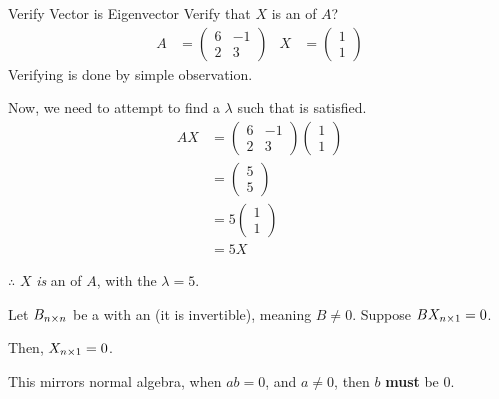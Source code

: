 \begin{example}{Verify Vector is Eigenvector}
  Verify that $X$ is an  of $A$?
  \begin{align*}
    A &=
        \begin{pmatrix}
          6 & -1 \\
          2 & 3
        \end{pmatrix} &
                        X &=
                            \begin{pmatrix}
                              1 \\
                              1
                            \end{pmatrix}
  \end{align*}
  \tcblower{}
  Verifying  is done by simple observation.

  Now, we need to attempt to find a $\lambda$ such that  is satisfied.
  \begin{align*}
    AX &=
         \begin{pmatrix}
           6 & -1 \\
           2 & 3
         \end{pmatrix}
               \begin{pmatrix}
                 1 \\
                 1
               \end{pmatrix} \\
    &=
      \begin{pmatrix}
        5 \\
        5
      \end{pmatrix} \\
    &= 5
      \begin{pmatrix}
        1 \\
        1
      \end{pmatrix} \\
    &= 5 X
  \end{align*}

  $\therefore$ $X$ \textit{is} an  of $A$, with the  $\lambda = 5$.
\end{example}

\begin{lemma}\label{lem:Matrix_Multiply_Zero_Vector}
  Let $B_{n \times n}$ be a  with an  (it is invertible), meaning $B \neq 0$.
  Suppose $B X_{n \times 1} = 0$.

  Then, $X_{n \times 1} = 0$.

  \begin{remark*}
    This mirrors normal algebra, when $ab = 0$, and $a \neq 0$, then $b$ \textbf{must} be $0$.
  \end{remark*}
\end{lemma}

